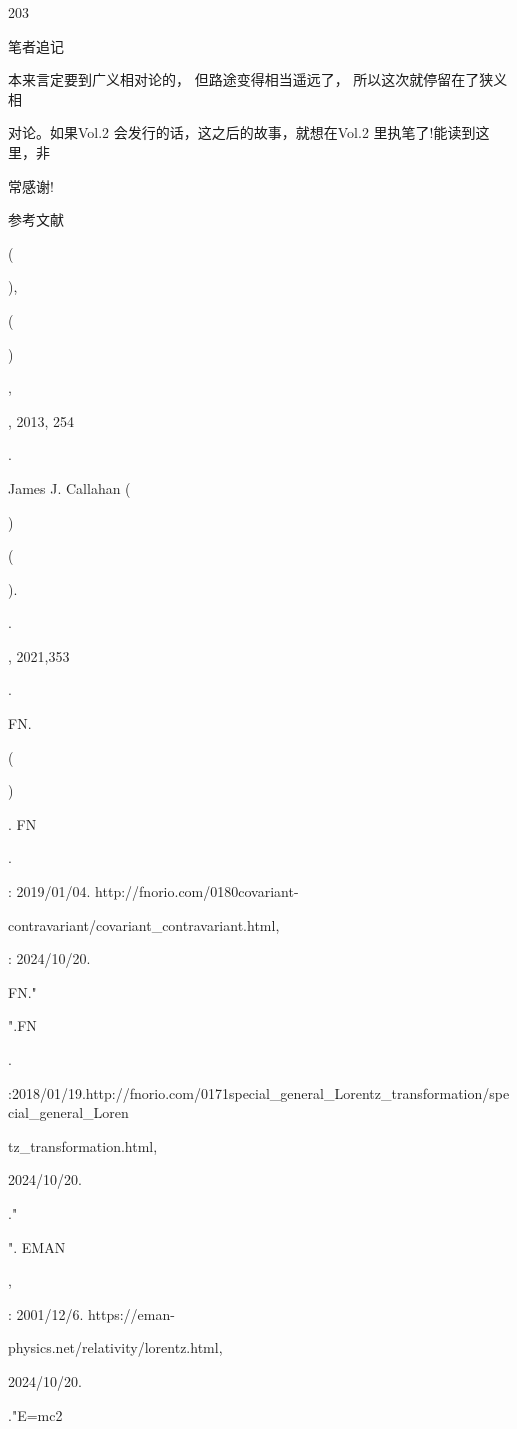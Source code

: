 203\par
笔者追记\par
本来言定要到广义相对论的， 但路途变得相当遥远了， 所以这次就停留在了狭义相\par
对论。如果Vol.2 会发行的话，这之后的故事，就想在Vol.2 里执笔了!能读到这里，非\par
常感谢!\par
参考文献\par
[1]\par
(\par
),\par
(\par
)\par
,\par
, 2013, 254\par
.\par
[2] James J. Callahan (\par
)\par
(\par
).\par
.\par
, 2021,353\par
.\par
[3] FN.\par
(\par
)\par
. FN\par
.\par
: 2019/01/04. http://fnorio.com/0180covariant-\par
contravariant/covariant\_contravariant.html,\par
: 2024/10/20.\par
[4] FN."\par
".FN\par
.\par
:2018/01/19.http://fnorio.com/0171special\_general\_Lorentz\_transformation/special\_general\_Loren\par
tz\_transformation.html,\par
2024/10/20.\par
[5]\par
."\par
". EMAN\par
,\par
: 2001/12/6. https://eman-\par
physics.net/relativity/lorentz.html,\par
2024/10/20.\par
[6]\par
."E=mc2\par
